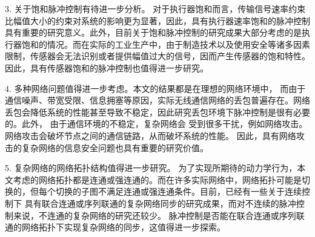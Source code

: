 3. 关于饱和脉冲控制有待进一步分析。 对于执行器饱和而言，传输信号速率约束比幅值大小的约束对系统的影响更为显著，因此，具有执行器速率饱和的脉冲控制具有重要的研究意义。此外，目前关于饱和脉冲控制的研究成果大部分考虑的是执行器饱和的情况。而在实际的工业生产中，由于制造技术以及使用安全等诸多因素限制，传感器会无法识别或者提供幅值过大的信号，因而产生传感器的饱和特性。因此，具有传感器饱和的脉冲控制也值得进一步研究。
 
4. 多种网络问题值得进一步考虑。本文的结果都是在理想的网络环境中， 而由于通信噪声、带宽受限、信息拥塞等原因，实际无线通信网络的丢包普遍存在。网络丢包会降低系统的性能甚至导致不稳定，因此研究丢包环境下脉冲控制是很有必要的。此外， 由于通信环境的不稳定，复杂网络会
受到很多干扰，例如网络攻击。网络攻击会破坏节点之间的通信链路，从而破坏系统的性能。 因此，具有网络攻击的复杂网络的信息安全问题也具有重要的研究价值。

5. 复杂网络的网络拓扑结构值得进一步研究。 为了实现所期待的动力学行为，本文考虑的网络拓扑都是连通或强连通的。而在许多实际网络中，网络拓扑可能是切换的，但每个切换的子图不满足连通或强连通条件。目前，已经有一些关于连续控制下
具有联合连通或序列联通的复杂网络同步的研究成果，而对不连续的脉冲控制来说，不连通的复杂网络的研究还较少。 脉冲控制是否能在联合连通或序列联通的网络拓扑下实现复杂网络的同步，这值得进一步探索。
 
